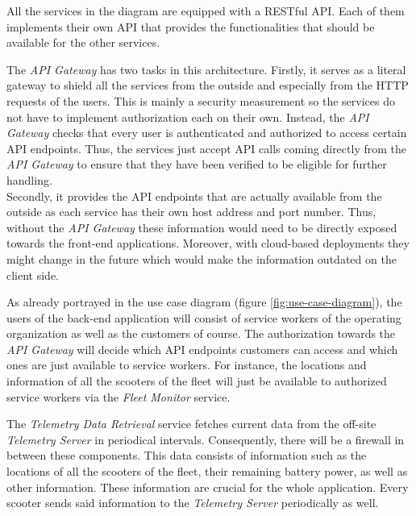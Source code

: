 \documentclass[12pt,a4paper]{report}
\begin{document}
All the services in the diagram are equipped with a RESTful API.
Each of them implements their own API that provides the functionalities that
should be available for the other services.

The \textit{API Gateway} has two tasks in this architecture.
Firstly, it serves as a literal gateway to shield all the services from
the outside and especially from the HTTP requests of the users.
This is mainly a security measurement so the services do not have to
implement authorization each on their own. Instead, the \textit{API Gateway}
checks that every user is authenticated and authorized to access certain
API endpoints. Thus, the services just accept API calls coming directly from
the \textit{API Gateway} to ensure that they have been verified to be eligible
for further handling.\\
Secondly, it provides the API endpoints that are actually available from the
outside as each service has their own host address and port number.
Thus, without the \textit{API Gateway} these information would need to be
directly exposed towards the front-end applications. Moreover, with cloud-based
deployments they might change in the future which would make the information
outdated on the client side.

As already portrayed in the use case diagram (figure \ref{fig:use-case-diagram}),
the users of the back-end application will consist of service workers of the
operating organization as well as the customers of course.
The authorization towards the \textit{API Gateway} will decide which
API endpoints customers can access and which ones are just available to
service workers. For instance, the locations and information of all the scooters
of the fleet will just be available to authorized service workers via the
\textit{Fleet Monitor} service.

The \textit{Telemetry Data Retrieval} service fetches current data from the
off-site \textit{Telemetry Server} in periodical intervals.
Consequently, there will be a firewall in between these components.
This data consists of information such as the locations of all the scooters
of the fleet, their remaining battery power, as well as other information.
These information are crucial for the whole application.
Every scooter sends said information to the \textit{Telemetry Server}
periodically as well.
\end{document}
